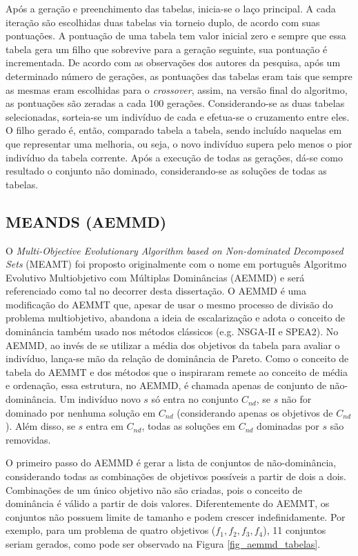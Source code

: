 Após a geração e preenchimento das tabelas, inicia-se o laço principal. A cada iteração são escolhidas duas tabelas via torneio duplo, de acordo com suas pontuações. A pontuação de uma tabela tem valor inicial zero e sempre que essa tabela gera um filho que sobrevive para a geração seguinte, sua pontuação é incrementada. De acordo com as observações dos autores da pesquisa, após um determinado número de gerações, as pontuações das tabelas eram tais que sempre as mesmas eram escolhidas para o \textit{crossover}, assim, na versão final do algoritmo, as pontuações são zeradas a cada 100 gerações. Considerando-se as duas tabelas selecionadas, sorteia-se um indivíduo de cada e efetua-se o cruzamento entre eles. O filho gerado é, então, comparado tabela a tabela, sendo incluído naquelas em que representar uma melhoria, ou seja, o novo indivíduo supera pelo menos o pior indivíduo da tabela corrente. Após a execução de todas as gerações, dá-se como resultado o conjunto não dominado, considerando-se as soluções de todas as tabelas.

\subsection{MEANDS (AEMMD)}
\label{section_aemmd}

O \textit{Multi-Objective Evolutionary Algorithm based on Non-dominated Decomposed Sets} (MEAMT) \cite{Lafeta2016} foi proposto originalmente com o nome em português Algoritmo Evolutivo Multiobjetivo com Múltiplas Dominâncias (AEMMD) e será referenciado como tal no decorrer desta dissertação. O AEMMD é uma modificação do AEMMT que, apesar de usar o mesmo processo de divisão do problema multiobjetivo, abandona a ideia de escalarização e adota o conceito de dominância também usado nos métodos clássicos (e.g. NSGA-II e SPEA2). No AEMMD, ao invés de se utilizar a média dos objetivos da tabela para avaliar o indivíduo, lança-se mão da relação de dominância de Pareto. Como o conceito de tabela do AEMMT e dos métodos que o inspiraram remete ao conceito de média e ordenação, essa estrutura, no AEMMD, é chamada apenas de conjunto de não-dominância. Um indivíduo novo $s$ só entra no conjunto $C_{nd}$, se $s$ não for dominado por nenhuma solução em $C_{nd}$ (considerando apenas os objetivos de $C_{nd}$). Além disso, se $s$ entra em $C_{nd}$, todas as soluções em $C_{nd}$ dominadas por $s$ são removidas.

O primeiro passo do AEMMD é gerar a lista de conjuntos de não-dominância, considerando todas as combinações de objetivos possíveis a partir de dois a dois. Combinações de um único objetivo não são criadas, pois o conceito de dominância é válido a partir de dois valores. Diferentemente do AEMMT, os conjuntos não possuem limite de tamanho e podem crescer indefinidamente. Por exemplo, para um problema de quatro objetivos ($f_1, f_2, f_3, f_4$), 11 conjuntos seriam gerados, como pode ser observado na Figura \ref{fig_aemmd_tabelas}.


